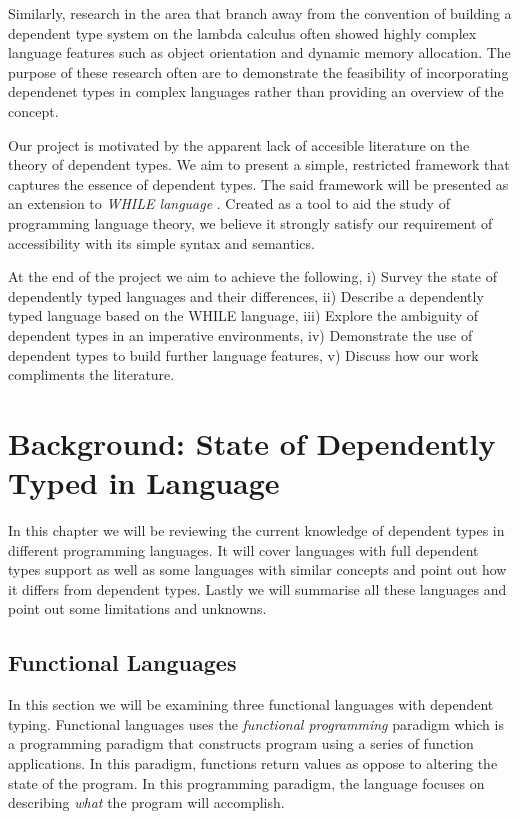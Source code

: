 \documentclass[a4paper,12pt]{report}
\begin{document}
\par
Similarly, research in the area that branch away from the convention of building 
a dependent type system on the lambda calculus often showed highly complex 
language features such as object orientation and dynamic memory allocation. The 
purpose of these research often are to demonstrate the feasibility of 
incorporating dependenet types in complex languages rather than providing an 
overview of the concept. 

\par
Our project is motivated by the apparent lack of accesible literature on the 
theory of dependent types. We aim to present a simple, restricted framework that 
captures the essence of dependent types. The said framework will be presented as 
an extension to \textit{WHILE language} \cite{whileLanguage}. Created as a tool 
to aid the study of programming language theory, we believe it strongly satisfy our 
requirement of accessibility with its simple syntax and semantics. 

\par
At the end of the project we aim to achieve the following, i) Survey the state 
of dependently typed languages and their differences, ii) Describe a dependently 
typed language based on the WHILE language, iii) Explore the ambiguity of 
dependent types in an imperative environments, iv) Demonstrate the use of 
dependent types to build further language features, v) Discuss how our work 
compliments the literature. 



\chapter{Background: State of Dependently Typed in Language} 
In this chapter we will be reviewing the current knowledge of dependent types 
in different programming languages. It will cover languages with full dependent 
types support as well as some languages with similar concepts and point out how 
it differs from dependent types. Lastly we will summarise all these languages 
and point out some limitations and unknowns. 

\section{Functional Languages}

In this section we will be examining three functional languages with 
dependent typing. Functional languages 
uses the \textit{functional programming} \cite{overviewFP} paradigm which is a programming 
paradigm that constructs program using a series of function applications. In 
this paradigm, functions return values as oppose to altering the state of the 
program. In this programming paradigm, the language focuses on describing 
\textit{what} the program will accomplish.
\end{document}
